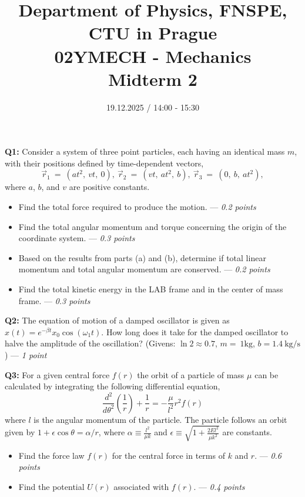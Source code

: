 \documentclass[a4paper,12pt]{article}
\title{{\large Department of Physics, FNSPE, CTU in Prague} \\
                  02YMECH - Mechanics \\ 
          {\Large \textbf{Midterm 2}}\vspace{-1cm}}
\date{19.12.2025 / 14:00 - 15:30}
\author{}
\begin{document}
\maketitle

\textbf{Q1:} Consider a system of three point particles, each having an identical mass $m$, with their positions defined by time-dependent vectors,
\begin{equation*}
    \vec r_{1}~=~(at^2,~vt,~0),~\vec r_{2}~=~(vt,~at^2,~b),~\vec r_{3}~=~(0,~b,~at^2), 
\end{equation*}
where $a$, $b$, and $v$ are positive constants.
\begin{itemize}
    \item[\textbf{a.}] Find the total force required to produce the motion. --- \textit{0.2 points}
    \item[\textbf{b.}] Find the total angular momentum and torque concerning the origin of the coordinate system. --- \textit{0.3 points}
    \item[\textbf{c.}] Based on the results from parts (a) and (b), determine if total linear momentum and total angular momentum are conserved. --- \textit{0.2 points}
    \item[\textbf{d.}] Find the total kinetic energy in the LAB frame and in the center of mass frame. --- \textit{0.3 points}
\end{itemize}

\vspace*{0.2cm}
\textbf{Q2:} The equation of motion of a damped oscillator is given as $x(t)=e^{-\beta t}x_0\cos{\left(\omega_1 t\right)}$. How long does it take for the damped oscillator to halve the amplitude of the oscillation? 
(Givens: $\ln2\approx 0.7$, $m=~1\text{kg}$, $b=1.4~\text{kg/s}$) --- \textit{1 point}

\vspace*{0.2cm}
\textbf{Q3:} For a given central force $f(r)$ the orbit of a particle of mass $\mu$ can be calculated by integrating the following differential equation,
\begin{equation*}
    \dfrac{d^2}{d\theta^2}\left(\frac{1}{r}\right)+\frac{1}{r}=-\frac{\mu}{l^2}r^2f(r)
\end{equation*}
where $l$ is the angular momentum of the particle. The particle follows an orbit given by $1+\epsilon\cos\theta=\alpha/r$, where $\alpha\equiv \frac{l^2}{\mu k}$ and $\epsilon \equiv \sqrt{1+\frac{2El^2}{\mu k^2}}$ are constants.

\begin{itemize}
    \item[\textbf{a.}] Find the force law $f(r)$ for the central force in terms of $k$ and $r$. --- \textit{0.6 points}
    \item[\textbf{b.}] Find the potential $U(r)$ associated with $f(r)$. --- \textit{0.4 points}
\end{itemize}
\end{document}
